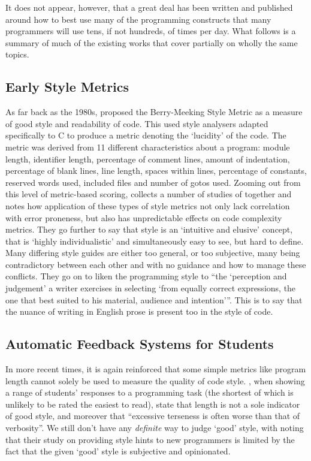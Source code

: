 \documentclass{article}
\begin{document}
    It does not appear, however, that a great deal has been written and published around how to best use many of the programming constructs that many programmers will use tens, if not hundreds, of times per day. What follows is a summary of much of the existing works that cover partially on wholly the same topics.
    \subsection{Early Style Metrics}
        As far back as the 1980s, \cite{berryMeekingStyle} proposed the Berry-Meeking Style Metric as a measure of good style and readability of code. This used style analysers adapted specifically to C to produce a metric denoting the `lucidity' of the code. The metric was derived from 11 different characteristics about a program: module length, identifier length, percentage of comment lines, amount of indentation, percentage of blank lines, line length, spaces within lines, percentage of constants, reserved words used, included files and number of gotos used. Zooming out from this level of metric-based scoring, \cite{paradigmForStyleResearch} collects a number of studies of together and notes how application of these types of style metrics not only lack correlation with error proneness, but also has unpredictable effects on code complexity metrics. They go further to say that style is an `intuitive and elusive' concept, that is `highly individualistic' and simultaneously easy to see, but hard to define. Many differing style guides are either too general, or too subjective, many being contradictory between each other and with no guidance and how to manage these conflicts. They go on to liken the programming style to ``the `perception and judgement' a writer exercises in selecting `from equally correct expressions, the one that best suited to his material, audience and intention'''. This is to say that the nuance of writing in English prose is present too in the style of code.

    \subsection{Automatic Feedback Systems for Students}
        In more recent times, it is again reinforced that some simple metrics like program length cannot solely be used to measure the quality of code style. \cite{autoStyleFeedbackAtScale}, when showing a range of students' responses to a programming task (the shortest of which is unlikely to be rated the easiest to read), state that length is not a sole indicator of good style, and moreover that ``excessive terseness is often worse than that of verbosity''. We still don't have any \emph{definite} way to judge `good' style, with \cite{scaleDrivenHints} noting that their study on providing style hints to new programmers is limited by the fact that the given `good' style is subjective and opinionated.
\end{document}
